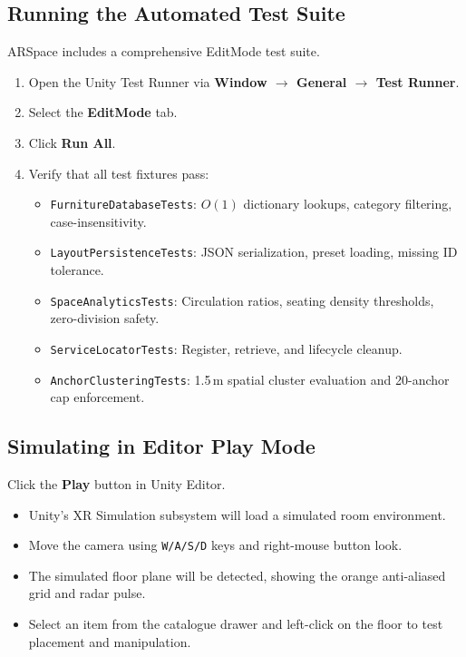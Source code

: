 \documentclass[11pt,a4paper]{article}
\begin{document}
\subsection{Running the Automated Test Suite}
ARSpace includes a comprehensive EditMode test suite.
\begin{enumerate}
    \item Open the Unity Test Runner via \textbf{Window $\rightarrow$ General $\rightarrow$ Test Runner}.
    \item Select the \textbf{EditMode} tab.
    \item Click \textbf{Run All}.
    \item Verify that all test fixtures pass:
    \begin{itemize}[noitemsep]
        \item \texttt{FurnitureDatabaseTests}: $O(1)$ dictionary lookups, category filtering, case-insensitivity.
        \item \texttt{LayoutPersistenceTests}: JSON serialization, preset loading, missing ID tolerance.
        \item \texttt{SpaceAnalyticsTests}: Circulation ratios, seating density thresholds, zero-division safety.
        \item \texttt{ServiceLocatorTests}: Register, retrieve, and lifecycle cleanup.
        \item \texttt{AnchorClusteringTests}: 1.5\,m spatial cluster evaluation and 20-anchor cap enforcement.
    \end{itemize}
\end{enumerate}

\subsection{Simulating in Editor Play Mode}
Click the \textbf{Play} button in Unity Editor.
\begin{itemize}
    \item Unity's XR Simulation subsystem will load a simulated room environment.
    \item Move the camera using \texttt{W/A/S/D} keys and right-mouse button look.
    \item The simulated floor plane will be detected, showing the orange anti-aliased grid and radar pulse.
    \item Select an item from the catalogue drawer and left-click on the floor to test placement and manipulation.
\end{itemize}
\end{document}
